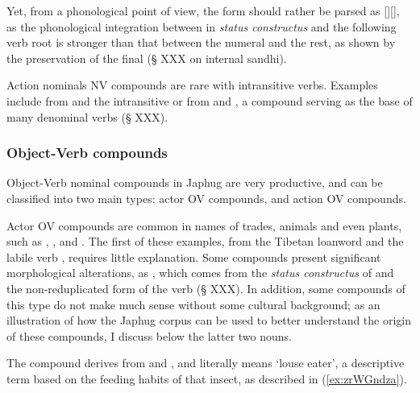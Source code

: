 Yet, from a phonological point of view, the form should rather be parsed as [][], as the phonological integration between  in \textit{status constructus} and the following verb root is stronger than that between the numeral  and the rest, as shown by the preservation of the final  (§ XXX on internal sandhi).

Action nominals NV compounds are rare with intransitive verbs. Examples include  from  and the intransitive  or  from   and , a compound serving as the base of many denominal verbs (§ XXX).

 
\subsubsection{Object-Verb compounds} \label{sec:object.verb.compounds}
Object-Verb nominal compounds in Japhug are very productive, and can be classified into two main types: actor OV compounds, and action OV compounds.

Actor OV compounds are common in names of trades, animals and even plants, such as , ,  and . The first of these examples, from the Tibetan loanword  and the labile verb , requires little explanation. Some compounds present significant morphological alterations, as  , which comes from the \textit{status constructus} of  and the non-reduplicated form of the verb  (§ XXX). In addition, some compounds of this type do not make much sense without some cultural background; as an illustration of how the Japhug corpus can be used to better understand the origin of these compounds, I discuss below the latter two nouns.

The compound  derives from  and , and literally means `louse eater', a descriptive term based on the feeding habits of that insect, as described in (\ref{ex:zrWGndza}).

